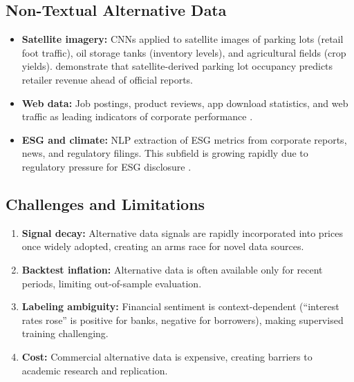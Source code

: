 \subsection{Non-Textual Alternative Data}

\begin{itemize}[leftmargin=*]
    \item \textbf{Satellite imagery:} CNNs applied to satellite images of parking lots (retail foot traffic), oil storage tanks (inventory levels), and agricultural fields (crop yields). \citet{Katona2021} demonstrate that satellite-derived parking lot occupancy predicts retailer revenue ahead of official reports.

    \item \textbf{Web data:} Job postings, product reviews, app download statistics, and web traffic as leading indicators of corporate performance \citep{Green2019}.

    \item \textbf{ESG and climate:} NLP extraction of ESG metrics from corporate reports, news, and regulatory filings. This subfield is growing rapidly due to regulatory pressure for ESG disclosure \citep{Kalesnik2022}.
\end{itemize}

\subsection{Challenges and Limitations}

\begin{enumerate}[leftmargin=*]
    \item \textbf{Signal decay:} Alternative data signals are rapidly incorporated into prices once widely adopted, creating an arms race for novel data sources.
    \item \textbf{Backtest inflation:} Alternative data is often available only for recent periods, limiting out-of-sample evaluation.
    \item \textbf{Labeling ambiguity:} Financial sentiment is context-dependent (``interest rates rose'' is positive for banks, negative for borrowers), making supervised training challenging.
    \item \textbf{Cost:} Commercial alternative data is expensive, creating barriers to academic research and replication.
\end{enumerate}
